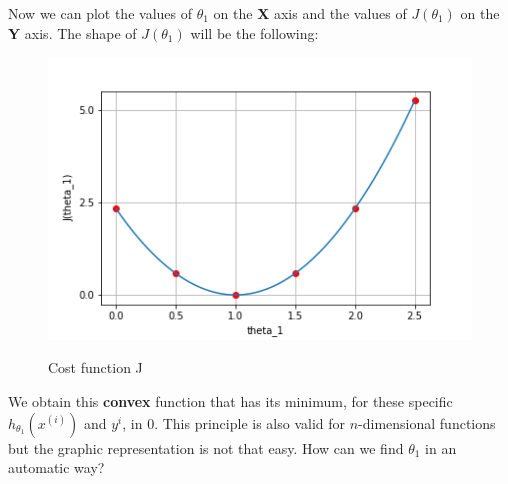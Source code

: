 Now we can plot the values of $\theta_{1}$ on the \textbf{X} axis and the values of $J(\theta_{1})$ on the \textbf{Y} axis. The shape of $J(\theta_{1})$ will be the following:
\begin{figure}[h]
    \centering
    \includegraphics[scale = 0.7]{images/J.png}
    \label{Fig 1}
    \caption{Cost function J}
\end{figure}\newline
We obtain this \textbf{convex} function that has its minimum, for these specific $h_{\theta_{1}}(x^{(i)})$ and $y^{i}$, in 0. This principle is also valid for $n$-dimensional functions but the graphic representation is not that easy.\newline
How can we find $\theta_{1}$ in an automatic way?
